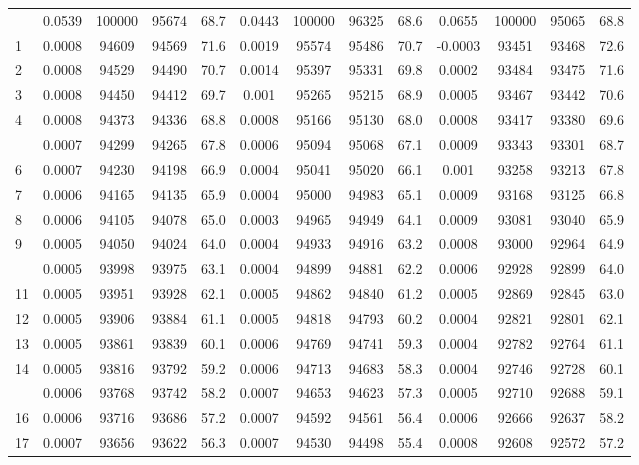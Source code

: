 \documentclass[
  14pt,
]{article}
\begin{document}
\begin{longtable}[t]{lcccccccccccc}
\endfoot
\bottomrule
\endlastfoot
0 & 0.0539 & 100000 & 95674 & 68.7 & 0.0443 & 100000 & 96325 & 68.6 & 0.0655 & 100000 & 95065 & 68.8\\
1 & 0.0008 & 94609 & 94569 & 71.6 & 0.0019 & 95574 & 95486 & 70.7 & -0.0003 & 93451 & 93468 & 72.6\\
2 & 0.0008 & 94529 & 94490 & 70.7 & 0.0014 & 95397 & 95331 & 69.8 & 0.0002 & 93484 & 93475 & 71.6\\
3 & 0.0008 & 94450 & 94412 & 69.7 & 0.001 & 95265 & 95215 & 68.9 & 0.0005 & 93467 & 93442 & 70.6\\
4 & 0.0008 & 94373 & 94336 & 68.8 & 0.0008 & 95166 & 95130 & 68.0 & 0.0008 & 93417 & 93380 & 69.6\\
\addlinespace
5 & 0.0007 & 94299 & 94265 & 67.8 & 0.0006 & 95094 & 95068 & 67.1 & 0.0009 & 93343 & 93301 & 68.7\\
6 & 0.0007 & 94230 & 94198 & 66.9 & 0.0004 & 95041 & 95020 & 66.1 & 0.001 & 93258 & 93213 & 67.8\\
7 & 0.0006 & 94165 & 94135 & 65.9 & 0.0004 & 95000 & 94983 & 65.1 & 0.0009 & 93168 & 93125 & 66.8\\
8 & 0.0006 & 94105 & 94078 & 65.0 & 0.0003 & 94965 & 94949 & 64.1 & 0.0009 & 93081 & 93040 & 65.9\\
9 & 0.0005 & 94050 & 94024 & 64.0 & 0.0004 & 94933 & 94916 & 63.2 & 0.0008 & 93000 & 92964 & 64.9\\
\addlinespace
10 & 0.0005 & 93998 & 93975 & 63.1 & 0.0004 & 94899 & 94881 & 62.2 & 0.0006 & 92928 & 92899 & 64.0\\
11 & 0.0005 & 93951 & 93928 & 62.1 & 0.0005 & 94862 & 94840 & 61.2 & 0.0005 & 92869 & 92845 & 63.0\\
12 & 0.0005 & 93906 & 93884 & 61.1 & 0.0005 & 94818 & 94793 & 60.2 & 0.0004 & 92821 & 92801 & 62.1\\
13 & 0.0005 & 93861 & 93839 & 60.1 & 0.0006 & 94769 & 94741 & 59.3 & 0.0004 & 92782 & 92764 & 61.1\\
14 & 0.0005 & 93816 & 93792 & 59.2 & 0.0006 & 94713 & 94683 & 58.3 & 0.0004 & 92746 & 92728 & 60.1\\
\addlinespace
15 & 0.0006 & 93768 & 93742 & 58.2 & 0.0007 & 94653 & 94623 & 57.3 & 0.0005 & 92710 & 92688 & 59.1\\
16 & 0.0006 & 93716 & 93686 & 57.2 & 0.0007 & 94592 & 94561 & 56.4 & 0.0006 & 92666 & 92637 & 58.2\\
17 & 0.0007 & 93656 & 93622 & 56.3 & 0.0007 & 94530 & 94498 & 55.4 & 0.0008 & 92608 & 92572 & 57.2\\

\end{longtable}
\end{document}
